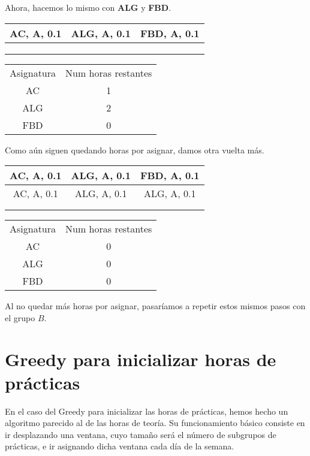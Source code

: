 Ahora, hacemos lo mismo con \textbf{ALG} y \textbf{FBD}.

\begin{minipage}{0.5\textwidth}    
\begin{tabular}{| c | c | c |}
\hline
AC, A, 0.1 & ALG, A, 0.1  & FBD, A, 0.1 \\
 \hline
 &  &  \\
 \hline
 &  &  \\
 \hline
 &  &  \\
 \hline 
\end{tabular}
\end{minipage}
\begin{minipage}{0.5\textwidth}
\begin{tabular}{c | c}
Asignatura & Num horas restantes \\
AC & 1 \\
ALG & 2 \\
FBD & 0
\end{tabular}
\end{minipage}

Como aún siguen quedando horas por asignar, damos otra vuelta más.

\begin{minipage}{0.5\textwidth}    
\begin{tabular}{| c | c | c |}
\hline
AC, A, 0.1 & ALG, A, 0.1  & FBD, A, 0.1 \\
 \hline
AC, A, 0.1 & ALG, A, 0.1 & ALG, A, 0.1  \\
 \hline
 &  &  \\
 \hline
 &  &  \\
 \hline 
\end{tabular}
\end{minipage}
\begin{minipage}{0.5\textwidth}
\begin{tabular}{c | c}
Asignatura & Num horas restantes \\
AC & 0 \\
ALG & 0 \\
FBD & 0
\end{tabular}
\end{minipage}

Al no quedar más horas por asignar, pasaríamos a repetir estos mismos pasos con el grupo $B$.

\section{Greedy para inicializar horas de prácticas}
En el caso del Greedy para inicializar las horas de prácticas, hemos hecho un algoritmo parecido al de las horas de teoría. Su funcionamiento básico consiste en ir desplazando una ventana, cuyo tamaño será el número de subgrupos de prácticas, e ir asignando dicha ventana cada día de la semana.

